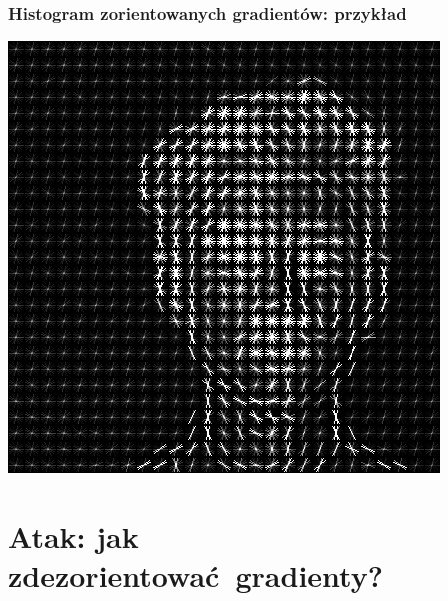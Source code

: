 \documentclass{beamer}
\begin{document}
            \begin{frame}
                \frametitle{Histogram zorientowanych gradientów: przykład}
                \begin{center}
                    \includegraphics[height=0.8\textheight]{pictures/hog_exposed.png}
                \end{center}
            \end{frame}

    \section{Atak: jak zdezorientować gradienty?}
\end{document}
